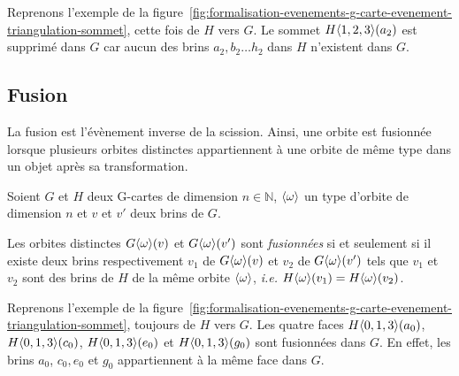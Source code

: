 Reprenons l'exemple de la figure~\ref{fig:formalisation-evenements-g-carte-evenement-triangulation-sommet},
cette fois de $H$ vers $G$. %
Le sommet $H\langle1,2,3\rangle(a_{2})$ est supprimé dans $G$ car aucun des brins
$a_2,b_2\ldots h_2$ dans $H$ n'existent dans $G$. %


\subsection{Fusion}
\label{sec:formalisation-evenements-transfo-objets-fusion}


La fusion est l'évènement inverse de la scission. %
Ainsi, une orbite est fusionnée lorsque plusieurs orbites distinctes appartiennent à une orbite de même type dans un objet après sa transformation. %
\begin{definition}
	Soient $G$ et $H$ deux G-cartes de dimension $n \in \mathbb{N}$,
	$\langle\omega\rangle$ un type d'orbite de dimension $n$ et $v$ et $v'$ deux brins de $G$. %

	Les orbites distinctes $G\langle\omega\rangle(v)$ et $G\langle\omega\rangle(v')$ sont
	\emph{fusionnées} si et seulement si il existe deux brins respectivement
	$v_{1}$ de $G\langle\omega\rangle(v)$ et $v_{2}$ de $G\langle\omega\rangle(v')$ tels que
	$v_{1}$ et $v_{2}$ sont des brins de $H$ de la même orbite $\langle\omega\rangle$, \textit{i.e.}
	$H\langle\omega\rangle(v_{1}) = H\langle\omega\rangle(v_{2})$. %

\end{definition}


Reprenons l'exemple de la figure~\ref{fig:formalisation-evenements-g-carte-evenement-triangulation-sommet}, toujours de $H$ vers $G$.
Les quatre faces $H\langle0,1,3\rangle(a_0)$, $H\langle0,1,3\rangle(c_0)$, $H\langle0,1,3\rangle(e_0)$ et $H\langle0,1,3\rangle(g_0)$ sont fusionnées dans $G$. %
En effet, les brins $a_0$, $c_0, e_0$ et $g_0$ appartiennent à la même face dans $G$. %



